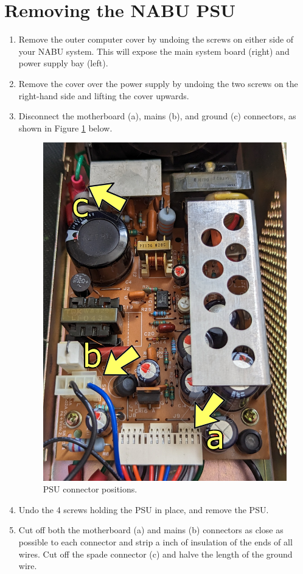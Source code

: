 \documentclass[twocolumn]{report}
\begin{document}
\section{Removing the NABU PSU}
\begin{enumerate}
	\item Remove the outer computer cover by undoing the screws on either side of your NABU system. This will expose the main system board (right) and power supply bay (left).
	\item Remove the cover over the power supply by undoing the two screws on the right-hand side and lifting the cover upwards.
	\item Disconnect the motherboard (a), mains (b), and ground (c) connectors, as shown in Figure \ref{fig:connectors} below.
	\begin{figure}[t!]
		\includegraphics[width=\columnwidth]{images/psu-image-0.jpg}
		\caption{PSU connector positions.}
		\label{fig:connectors}
	\end{figure}
	\item Undo the 4 screws holding the PSU in place, and remove the PSU.
	\item Cut off both the motherboard (a) and mains (b) connectors as close as possible to each connector and strip a \textonequarter inch of insulation of the ends of all wires. Cut off the spade connector (c) and halve the length of the ground wire.
\end{enumerate}
\end{document}
